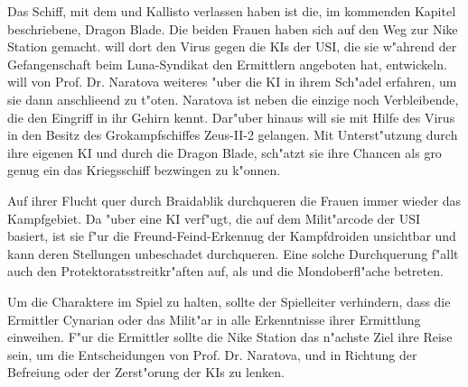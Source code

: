 \begin{remarks}
	Das Schiff, mit dem \xl{} und \ml{} Kallisto verlassen haben ist die, im kommenden Kapitel beschriebene, Dragon Blade. Die beiden Frauen haben sich auf den Weg zur Nike Station gemacht. \ml{} will dort den Virus gegen die KIs der USI, die sie w"ahrend der Gefangenschaft beim Luna-Syndikat den Ermittlern angeboten hat, entwickeln. \xl{} will von Prof. Dr. Naratova weiteres "uber die KI in ihrem Sch"adel erfahren, um sie dann anschlie\3end zu t"oten. Naratova ist neben \ml{} die einzige noch Verbleibende, die den Eingriff in ihr Gehirn kennt. Dar"uber hinaus will sie mit Hilfe des Virus in den Besitz des Gro\3kampfschiffes Zeus-II-2 gelangen. Mit Unterst"utzung durch ihre eigenen KI und durch die Dragon Blade, sch"atzt sie ihre Chancen als gro\3 genug ein das Kriegsschiff bezwingen zu k"onnen.

	Auf ihrer Flucht quer durch Braidablik durchqueren die Frauen immer wieder das Kampfgebiet. Da \xl{} "uber eine KI verf"ugt, die auf dem Milit"arcode der USI basiert, ist sie f"ur die Freund-Feind-Erkennug der Kampfdroiden unsichtbar und kann deren Stellungen unbeschadet durchqueren. Eine solche Durchquerung f"allt auch den Protektoratsstreitkr"aften auf, als \xl{} und \ml{} die Mondoberfl"ache betreten. 

	Um die Charaktere im Spiel zu halten, sollte der Spielleiter verhindern, dass die Ermittler Cynarian oder das Milit"ar in alle Erkenntnisse ihrer Ermittlung einweihen. F"ur die Ermittler sollte die Nike Station das n"achste Ziel ihre Reise sein, um die Entscheidungen von Prof. Dr. Naratova, \ml{} und \xl{} in Richtung der Befreiung oder der Zerst"orung der KIs zu lenken.
\end{remarks}
